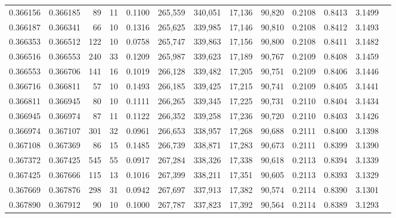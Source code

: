 \begin{tabular}{rrrrrrrrrrrrr}
0.366156 & 0.366185 &    89 &  11 &                                     0.1100 & 265,559 & 340,051 &  17,136 &  90,820 & 0.2108 & 0.8413 & 3.1499 \\
0.366187 & 0.366341 &    66 &  10 &                                     0.1316 & 265,625 & 339,985 &  17,146 &  90,810 & 0.2108 & 0.8412 & 3.1493 \\
0.366353 & 0.366512 &   122 &  10 &                                     0.0758 & 265,747 & 339,863 &  17,156 &  90,800 & 0.2108 & 0.8411 & 3.1482 \\
0.366516 & 0.366553 &   240 &  33 &                                     0.1209 & 265,987 & 339,623 &  17,189 &  90,767 & 0.2109 & 0.8408 & 3.1459 \\
0.366553 & 0.366706 &   141 &  16 &                                     0.1019 & 266,128 & 339,482 &  17,205 &  90,751 & 0.2109 & 0.8406 & 3.1446 \\
0.366716 & 0.366811 &    57 &  10 &                                     0.1493 & 266,185 & 339,425 &  17,215 &  90,741 & 0.2109 & 0.8405 & 3.1441 \\
0.366811 & 0.366945 &    80 &  10 &                                     0.1111 & 266,265 & 339,345 &  17,225 &  90,731 & 0.2110 & 0.8404 & 3.1434 \\
0.366945 & 0.366974 &    87 &  11 &                                     0.1122 & 266,352 & 339,258 &  17,236 &  90,720 & 0.2110 & 0.8403 & 3.1426 \\
0.366974 & 0.367107 &   301 &  32 &                                     0.0961 & 266,653 & 338,957 &  17,268 &  90,688 & 0.2111 & 0.8400 & 3.1398 \\
0.367108 & 0.367369 &    86 &  15 &                                     0.1485 & 266,739 & 338,871 &  17,283 &  90,673 & 0.2111 & 0.8399 & 3.1390 \\
0.367372 & 0.367425 &   545 &  55 &                                     0.0917 & 267,284 & 338,326 &  17,338 &  90,618 & 0.2113 & 0.8394 & 3.1339 \\
0.367425 & 0.367666 &   115 &  13 &                                     0.1016 & 267,399 & 338,211 &  17,351 &  90,605 & 0.2113 & 0.8393 & 3.1329 \\
0.367669 & 0.367876 &   298 &  31 &                                     0.0942 & 267,697 & 337,913 &  17,382 &  90,574 & 0.2114 & 0.8390 & 3.1301 \\
0.367890 & 0.367912 &    90 &  10 &                                     0.1000 & 267,787 & 337,823 &  17,392 &  90,564 & 0.2114 & 0.8389 & 3.1293 \\

\end{tabular}
